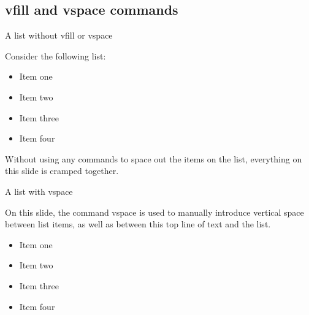 \subsection{vfill and vspace commands}

\begin{frame}{A list without vfill or vspace}

Consider the following list:

\begin{itemize}

\item Item one

\item Item two 

\item Item three 

\item Item four
\end{itemize} 

Without using any commands to space out the items on the list, everything on this slide is cramped together.

\end{frame}

\begin{frame}{A list with vspace}

On this slide, the command vspace is used to manually introduce vertical space between list items, as well as between this top line of text and the list.

\vspace{2em}

\begin{itemize}

\item Item one

\vspace{1em}

\item Item two 

\vspace{1em}

\item Item three 

\vspace{1em}

\item Item four

\vspace{1em}
\end{itemize} 

\end{frame}

